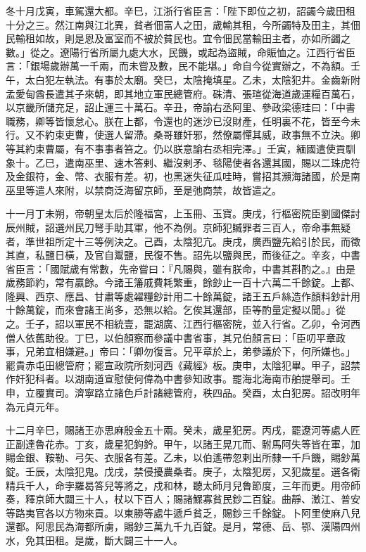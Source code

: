 \begin{pinyinscope}
 冬十月戊寅，車駕還大都。辛巳，江浙行省臣言：「陛下即位之初，詔蠲今歲田租十分之三。然江南與江北異，貧者佃富人之田，歲輸其租，今所蠲特及田主，其佃民輸租如故，則是恩及富室而不被於貧民也。宜令佃民當輸田主者，亦如所蠲之數。」從之。遼陽行省所屬九處大水，民饑，或起為盜賊，命賑恤之。江西行省臣言：「銀場歲辦萬一千兩，而未嘗及數，民不能堪。」命自今從實辦之，不為額。壬午，太白犯左執法。有事於太廟。癸巳，太陰掩填星。乙未，太陰犯井。金齒新附孟愛甸酋長遣其子來朝，即其地立軍民總管府。硃清、張瑄從海道歲運糧百萬石，以京畿所儲充足，詔止運三十萬石。辛丑，帝諭右丞阿里、參政梁德珪曰：「中書職務，卿等皆懷怠心。朕在上都，令還也的迷沙已沒財產，任明裏不花，皆至今未行。又不約束吏曹，使選人留滯。桑哥雖奸邪，然僚屬憚其威，政事無不立決。卿等其約束曹屬，有不事事者笞之。仍以朕意諭右丞相完澤。」壬寅，緬國遣使貢馴象十。乙巳，遣南巫里、速木答剌、繼沒剌矛、毯陽使者各還其國，賜以二珠虎符及金銀符，金、幣、衣服有差。初，也黑迷失征瓜哇時，嘗招其瀕海諸國，於是南巫里等遣人來附，以禁商泛海留京師，至是弛商禁，故皆遣之。



 十一月丁未朔，帝朝皇太后於隆福宮，上玉冊、玉寶。庚戌，行樞密院臣劉國傑討辰州賊，詔選州民刀弩手助其軍，他不為例。京師犯贓罪者三百人，帝命事無疑者，準世祖所定十三等例決之。己酉，太陰犯亢。庚戌，廣西鹽先給引於民，而徵其直，私鹽日橫，及官自鬻鹽，民復不售。詔先以鹽與民，而後征之。辛亥，中書省臣言：「國賦歲有常數，先帝嘗曰：『凡賜與，雖有朕命，中書其斟酌之。』由是歲務節約，常有贏餘。今諸王籓戚費耗繁重，餘鈔止一百十六萬二千餘錠。上都、隆興、西京、應昌、甘肅等處糴糧鈔計用二十餘萬錠，諸王五戶絲造作顏料鈔計用十餘萬錠，而來會諸王尚多，恐無以給。乞俟其還部，臣等酌量定擬以聞。」從之。壬子，詔以軍民不相統壹，罷湖廣、江西行樞密院，並入行省。乙卯，令河西僧人依舊助役。丁巳，以伯顏察而參議中書省事，其兄伯顏言曰：「臣叨平章政事，兄弟宜相嫌避。」帝曰：「卿勿復言。兄平章於上，弟參議於下，何所嫌也。」罷貴赤屯田總管府；罷宣政院所刻河西《藏經》板。庚申，太陰犯畢。甲子，詔禁作奸犯科者。以湖南道宣慰使何偉為中書參知政事。罷海北海南市舶提舉司。壬申，立覆實司。濟寧路立諸色戶計諸總管府，秩四品。癸酉，太白犯房。詔改明年為元貞元年。



 十二月辛巳，賜諸王亦思麻殷金五十兩。癸未，歲星犯房。丙戌，罷遼河等處人匠正副達魯花赤。丁亥，歲星犯鉤鈐。甲午，以諸王晃兀而、駙馬阿失等皆在軍，加賜金銀、鞍勒、弓矢、衣服各有差。乙未，以伯遙帶忽剌出所隸一千戶饑，賜鈔萬錠。壬辰，太陰犯鬼。戊戌，禁侵擾農桑者。庚子，太陰犯房，又犯歲星。選各衛精兵千人，命孛羅曷答兒等將之，戍和林，聽太師月兒魯節度，三年而更。用帝師奏，釋京師大闢三十人，杖以下百人；賜諸鰥寡貧民鈔二百錠。曲靜、澂江、普安等路夷官各以方物來貢。以東勝等處牛遞戶貧乏，賜鈔三千餘錠。卜阿里使麻八兒還都。阿思民為海都所虜，賜鈔三萬九千九百錠。是月，常德、岳、鄂、漢陽四州水，免其田租。是歲，斷大闢三十一人。




\end{pinyinscope}
